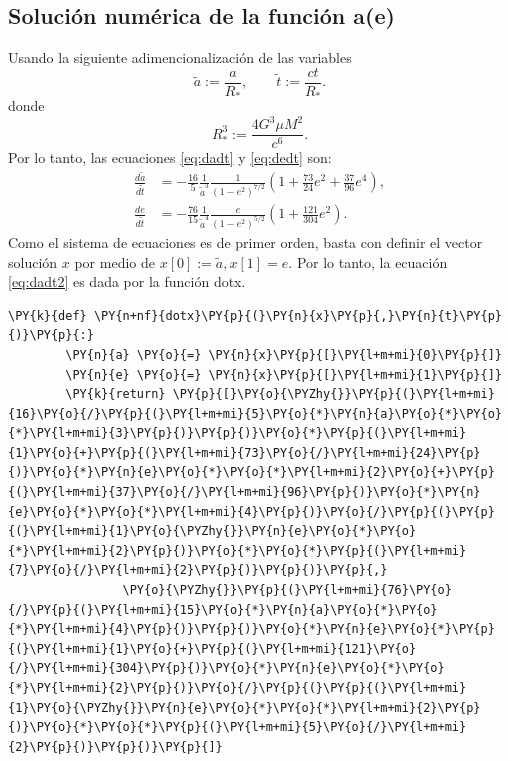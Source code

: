 \subsection{Solución numérica de la función a(e)}
Usando la siguiente adimencionalización \cite{Vito2008,Gonzalez2018,Gonz2019} de las variables
\begin{equation*}
    \tilde{a}:= \frac{a}{R_*}, \qquad  \tilde{t}:=\frac{ct}{R_*}.
\end{equation*}
donde
\begin{equation*}
    R_*^3 := \frac{4G^3\mu M^2}{c^6}.
\end{equation*}
Por lo tanto, las ecuaciones \ref{eq:dadt} y \ref{eq:dedt} son:
\begin{align}
    \label{eq:dadt2}
    \frac{d\tilde{a}}{d\tilde{t}} &= -\frac{16}{5}\frac{1}{\tilde{a}^3}\frac{1}{\left(1-e^2\right)^{7/2}}\left(1+\frac{73}{24}e^2+\frac{37}{96}e^4\right) ,\\
    \label{eq:dedt2}
\frac{de}{d\tilde{t}} &= -\frac{76}{15}\frac{1}{\tilde{a}^4}\frac{e}{\left(1-e^2\right)^{5/2}}\left(1+\frac{121}{304}e^2\right) .
\end{align}
Como el sistema de ecuaciones es de primer orden, basta con definir el vector solución $x$ por medio de $x[0]:=\tilde{a}, x[1]=e$. Por lo tanto, 
la ecuación \ref{eq:dadt2} es dada por la función \textcolor{def}{dotx}.
\begin{tcolorbox}[breakable, size=fbox, boxrule=1pt, pad at break*=1mm,colback=cellbackground, colframe=cellborder]
    \begin{Verbatim}[commandchars=\\\{\}]
    \PY{k}{def} \PY{n+nf}{dotx}\PY{p}{(}\PY{n}{x}\PY{p}{,}\PY{n}{t}\PY{p}{)}\PY{p}{:}
        \PY{n}{a} \PY{o}{=} \PY{n}{x}\PY{p}{[}\PY{l+m+mi}{0}\PY{p}{]}
        \PY{n}{e} \PY{o}{=} \PY{n}{x}\PY{p}{[}\PY{l+m+mi}{1}\PY{p}{]}
        \PY{k}{return} \PY{p}{[}\PY{o}{\PYZhy{}}\PY{p}{(}\PY{l+m+mi}{16}\PY{o}{/}\PY{p}{(}\PY{l+m+mi}{5}\PY{o}{*}\PY{n}{a}\PY{o}{*}\PY{o}{*}\PY{l+m+mi}{3}\PY{p}{)}\PY{p}{)}\PY{o}{*}\PY{p}{(}\PY{l+m+mi}{1}\PY{o}{+}\PY{p}{(}\PY{l+m+mi}{73}\PY{o}{/}\PY{l+m+mi}{24}\PY{p}{)}\PY{o}{*}\PY{n}{e}\PY{o}{*}\PY{o}{*}\PY{l+m+mi}{2}\PY{o}{+}\PY{p}{(}\PY{l+m+mi}{37}\PY{o}{/}\PY{l+m+mi}{96}\PY{p}{)}\PY{o}{*}\PY{n}{e}\PY{o}{*}\PY{o}{*}\PY{l+m+mi}{4}\PY{p}{)}\PY{o}{/}\PY{p}{(}\PY{p}{(}\PY{l+m+mi}{1}\PY{o}{\PYZhy{}}\PY{n}{e}\PY{o}{*}\PY{o}{*}\PY{l+m+mi}{2}\PY{p}{)}\PY{o}{*}\PY{o}{*}\PY{p}{(}\PY{l+m+mi}{7}\PY{o}{/}\PY{l+m+mi}{2}\PY{p}{)}\PY{p}{)}\PY{p}{,}
                \PY{o}{\PYZhy{}}\PY{p}{(}\PY{l+m+mi}{76}\PY{o}{/}\PY{p}{(}\PY{l+m+mi}{15}\PY{o}{*}\PY{n}{a}\PY{o}{*}\PY{o}{*}\PY{l+m+mi}{4}\PY{p}{)}\PY{p}{)}\PY{o}{*}\PY{n}{e}\PY{o}{*}\PY{p}{(}\PY{l+m+mi}{1}\PY{o}{+}\PY{p}{(}\PY{l+m+mi}{121}\PY{o}{/}\PY{l+m+mi}{304}\PY{p}{)}\PY{o}{*}\PY{n}{e}\PY{o}{*}\PY{o}{*}\PY{l+m+mi}{2}\PY{p}{)}\PY{o}{/}\PY{p}{(}\PY{p}{(}\PY{l+m+mi}{1}\PY{o}{\PYZhy{}}\PY{n}{e}\PY{o}{*}\PY{o}{*}\PY{l+m+mi}{2}\PY{p}{)}\PY{o}{*}\PY{o}{*}\PY{p}{(}\PY{l+m+mi}{5}\PY{o}{/}\PY{l+m+mi}{2}\PY{p}{)}\PY{p}{)}\PY{p}{]}
    \end{Verbatim}
    \end{tcolorbox}
